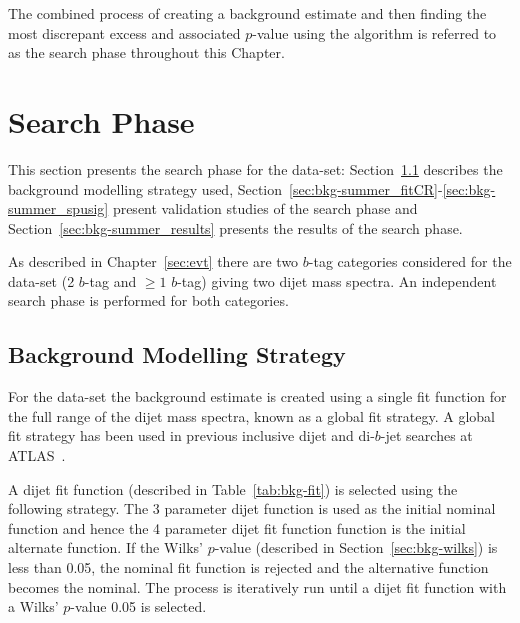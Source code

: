 
The combined process of creating a background estimate and then
finding the most discrepant excess and associated $p$-value using the \bh{} algorithm
is referred to as the search phase throughout this Chapter.

\clearpage
\section{\summer{} Search Phase}
\label{sec:bkg-summer}

This section presents the search phase for the \summer{} data-set:
Section~\ref{sec:bkg-summer_global} describes the background modelling strategy used,
Section~\ref{sec:bkg-summer_fitCR}-\ref{sec:bkg-summer_spusig}
present validation studies of the search phase
and Section~\ref{sec:bkg-summer_results} presents the results of the search phase.

As described in Chapter~\ref{sec:evt}
there are two $b$-tag categories considered for the \summer{} data-set 
(2 $b$-tag and $\geq1$ $b$-tag) giving two dijet mass spectra.
An independent search phase is performed for both categories.

\subsection{Background Modelling Strategy}
\label{sec:bkg-summer_global}

For the \summer{} data-set the background estimate is created using
a single fit function for the full range of the dijet mass spectra, known as a global fit strategy.
A global fit strategy has been used in previous inclusive dijet and di-$b$-jet searches at ATLAS~\cite{dijet-mori16_paper,dibjet-mori16_paper}.

A dijet fit function (described in Table~\ref{tab:bkg-fit}) is selected using the following strategy.
The 3 parameter dijet function is used as the initial nominal function and hence the 4 parameter dijet fit function function is the initial alternate function.
If the Wilks' \mbox{$p$-value} (described in Section~\ref{sec:bkg-wilks}) is less than 0.05,
the nominal fit function is rejected and the alternative function becomes the nominal.
The process is iteratively run until a dijet fit function with a Wilks' \mbox{$p$-value} \gt{} 0.05 is selected.

